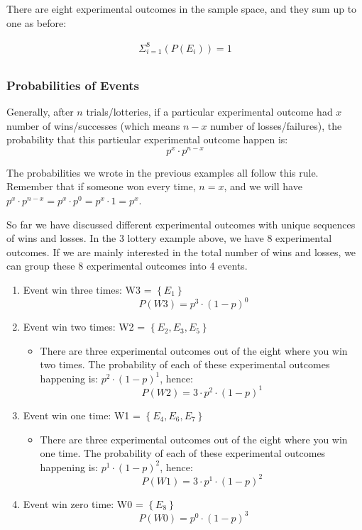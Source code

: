 \documentclass[
]{book}
\providecommand{\tightlist}{%
  \setlength{\itemsep}{0pt}\setlength{\parskip}{0pt}}
\begin{document}
There are eight experimental outcomes in the sample space, and they sum up to one as before:

\begin{align}
\Sigma_{i=1}^8 \left(P\left(E_i\right)\right) = 1 \\
\end{align}

\hypertarget{probabilities-of-events}{%
\subsubsection{Probabilities of Events}\label{probabilities-of-events}}

Generally, after \(n\) trials/lotteries, if a particular experimental outcome had \(x\) number of wins/successes (which means \(n-x\) number of losses/failures), the probability that this particular experimental outcome happen is:
\[ p^x \cdot p^{n-x} \]

The probabilities we wrote in the previous examples all follow this rule. Remember that if someone won every time, \(n=x\), and we will have \(p^x \cdot p^{n-x}=p^x \cdot p^0 = p^x \cdot 1 = p^x\).

So far we have discussed different experimental outcomes with unique sequences of wins and losses. In the 3 lottery example above, we have 8 experimental outcomes. If we are mainly interested in the total number of wins and losses, we can group these 8 experimental outcomes into 4 events.

\begin{enumerate}
\def\labelenumi{\arabic{enumi}.}
\tightlist
\item
  Event win three times: W3 = \(\left\{E_1\right\}\)
  \[P(W3)=p^{3} \cdot (1-p)^{0}\]
\item
  Event win two times: W2 = \(\left\{E_2, E_3, E_5\right\}\)

  \begin{itemize}
  \tightlist
  \item
    There are three experimental outcomes out of the eight where you win two times. The probability of each of these experimental outcomes happening is: \(p^{2} \cdot (1-p)^{1}\), hence: \[P(W2) = 3 \cdot p^{2} \cdot (1-p)^{1}\]
  \end{itemize}
\item
  Event win one time: W1 = \(\left\{E_4, E_6, E_7\right\}\)

  \begin{itemize}
  \tightlist
  \item
    There are three experimental outcomes out of the eight where you win one time. The probability of each of these experimental outcomes happening is: \(p^{1} \cdot (1-p)^{2}\), hence: \[P(W1) = 3 \cdot p^{1} \cdot (1-p)^{2}\]
  \end{itemize}
\item
  Event win zero time: W0 = \(\left\{E_8\right\}\)
  \[P(W0)=p^{0} \cdot (1-p)^{3}\]
\end{enumerate}
\end{document}
